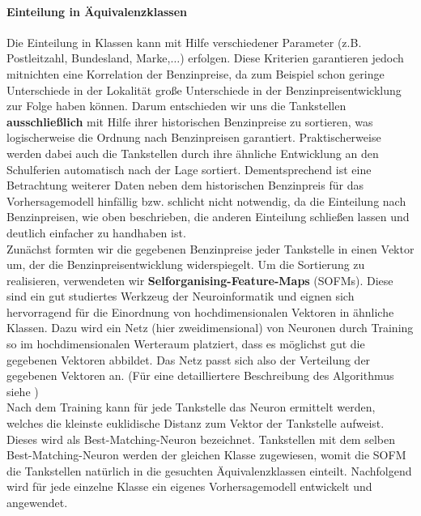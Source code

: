 \documentclass[11pt]{article}
\begin{document}
	\paragraph{Einteilung in Äquivalenzklassen\\}
	Die Einteilung in Klassen kann mit Hilfe verschiedener Parameter (z.B. Postleitzahl, Bundesland, Marke,$\ldots$) erfolgen. Diese Kriterien garantieren jedoch mitnichten eine Korrelation der Benzinpreise, da zum Beispiel schon geringe Unterschiede in der Lokalität große Unterschiede in der Benzinpreisentwicklung zur Folge haben können. Darum entschieden wir uns die Tankstellen \textbf{ausschließlich} mit Hilfe ihrer historischen Benzinpreise zu sortieren, was logischerweise die Ordnung nach Benzinpreisen garantiert. Praktischerweise werden dabei auch die Tankstellen durch ihre ähnliche Entwicklung an den Schulferien automatisch nach der Lage sortiert. Dementsprechend ist eine Betrachtung weiterer Daten neben dem historischen Benzinpreis für das Vorhersagemodell hinfällig bzw. schlicht nicht notwendig, da die Einteilung nach Benzinpreisen, wie oben beschrieben, die anderen Einteilung schließen lassen und deutlich einfacher zu handhaben ist. \\
	Zunächst formten wir die gegebenen Benzinpreise jeder Tankstelle in einen Vektor um, der die Benzinpreisentwicklung widerspiegelt. Um die Sortierung zu realisieren, verwendeten wir \textbf{Selforganising-Feature-Maps} (SOFMs). Diese sind ein gut studiertes Werkzeug der Neuroinformatik und eignen sich hervorragend für die Einordnung von hochdimensionalen Vektoren in ähnliche Klassen. Dazu wird ein Netz (hier zweidimensional) von Neuronen durch Training so im hochdimensionalen Werteraum platziert, dass es möglichst gut die gegebenen Vektoren abbildet. Das Netz passt sich also der Verteilung der gegebenen Vektoren an. (Für eine detailliertere Beschreibung des Algorithmus siehe \cite{SOFM})\\
	Nach dem Training kann für jede Tankstelle das Neuron ermittelt werden, welches die kleinste euklidische Distanz zum Vektor der Tankstelle aufweist. Dieses wird als \glqq Best-Matching-Neuron\grqq{} bezeichnet. Tankstellen mit dem selben Best-Matching-Neuron werden der gleichen Klasse zugewiesen, womit die SOFM die Tankstellen natürlich in die gesuchten Äquivalenzklassen einteilt. Nachfolgend wird für jede einzelne Klasse ein eigenes Vorhersagemodell entwickelt und angewendet.\\
	
\end{document}
